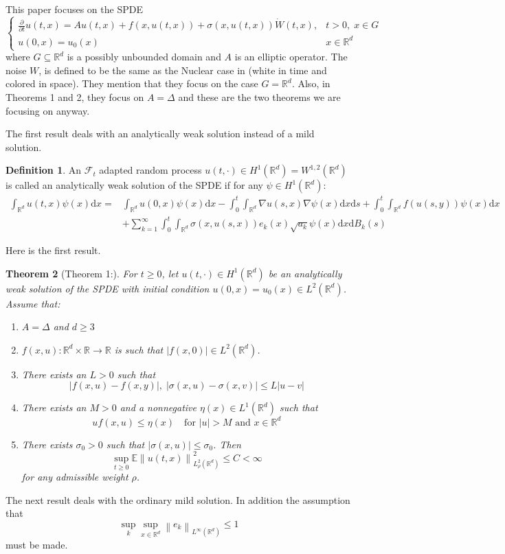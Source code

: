 \documentclass[a4paper,11pt]{article}%
\numberwithin{equation}{section}
\theoremstyle{plain}
\newtheorem{theorem}{Theorem}[section]
\theoremstyle{definition}
\newtheorem{definition}[theorem]{Definition}
\newcommand{\R}{\mathbb{R}}
\newcommand{\Norm}[1]{\left\|  #1   \right\|}
\newcommand{\ud}{\ensuremath{ \mathrm{d} }}
\begin{document}
This paper focuses on the SPDE
	\[
		\begin{cases}
			\frac{\partial}{\partial t} u(t,x) = A u(t,x) + f(x,u(t,x)) + \sigma(x,u(t,x)) \dot{W}(t,x), & t>0, \; x \in G
			\\ u(0,x) = u_0(x) & x \in \R^d
		\end{cases}
	\]
where $G \subseteq \R^d$ is a possibly unbounded domain and $A$ is an elliptic operator. The noise $W$, is defined to be the same as the Nuclear case in \cite{AM03} (white in time and colored in space). They mention that they focus on the case $G=\R^d$. Also, in Theorems 1 and 2, they focus on $A =\Delta$ and these are the two theorems we are focusing on anyway.

The first result deals with an analytically weak solution instead of a mild solution.

	\begin{definition}
		An $\mathcal{F}_t$ adapted random process $u(t,\cdot) \in H^1(\R^d) = W^{1,2}(\R^d)$ is called an analytically weak solution of the SPDE if for any $\psi \in H^1(\R^d)$:
			\begin{align*}
				\int_{\R^d} u(t,x)\psi(x) \ud x = & \int_{\R^d} u(0,x)\psi(x) \ud x - \int_0^t \int_{\R^d} \nabla u(s,x) \nabla \psi(x) \ud x \ud s + \int_0^t \int_{\R^d} f(u(s,y)) \psi(x) \ud x
				\\ &+ \sum_{k=1}^\infty \int_0^t \int_{\R^d} \sigma(x,u(s,x)) e_k(x) \sqrt{a_k} \psi(x) \ud x \ud B_k(s)
			\end{align*}
	\end{definition}

Here is the first result.

	\begin{theorem}[Theorem 1:]
For $ t \ge 0$, let $u(t,\cdot) \in H^1(\R^d)$ be an analytically weak solution of the SPDE with initial condition $u(0,x) = u_0(x) \in L^2(\R^d)$. Assume that:
		\begin{enumerate}
			\item $A = \Delta$ and $d \ge 3$
			\item $f(x,u) : \R^d \times \R \to \R$ is such that $|f(x,0)| \in L^2(\R^d)$.
			\item There exists an $L>0$ such that
				\[
					|f(x,u) - f(x,y)|, \; |\sigma(x,u) - \sigma(x,v)| \le L|u-v|
				\]
			\item There exists an $M > 0$ and a nonnegative $\eta(x) \in L^1(\R^d)$ such that
				\[
					uf(x,u) \le \eta(x) \quad \text{for } |u| > M \text{ and } x \in \R^d
				\]
			\item There exists $\sigma_0 >0$ such that $|\sigma(x,u)| \le \sigma_0$.
Then
	\[
		\sup_{t \ge 0} \mathbb{E}\Norm{u(t,x)}_{L^2_{\rho}(\R^d)}^2 \le C < \infty
	\]
for any admissible weight $\rho$.
		\end{enumerate}
	\end{theorem}
The next result deals with the ordinary mild solution. In addition the assumption that
	\[
		\sup_k \sup_{x\in \R^d} \Norm{e_k}_{L^\infty(\R^d)} \le 1
	\]
must be made.
\end{document}
